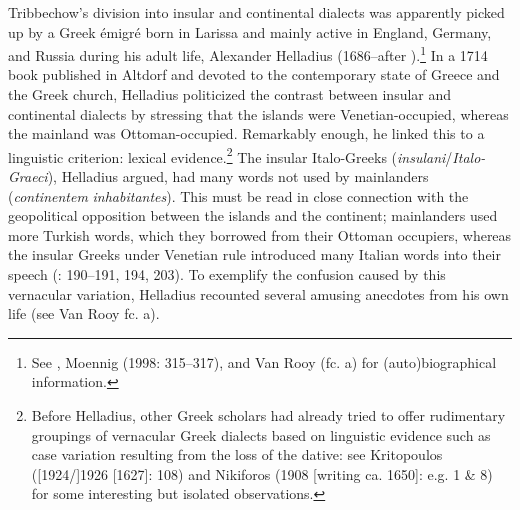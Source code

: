 Tribbechow’s division into insular and continental dialects was apparently picked up by a Greek émigré born in Larissa and mainly active in England, Germany, and Russia during his adult life, Alexander Helladius (1686–after \citealt{September1715}).\footnote{See \citet{Helladius1714}, Moennig (1998: 315–317), and Van Rooy (fc. a) for (auto)biographical information.} In a 1714 book published in Altdorf and devoted to the contemporary state of Greece and the Greek church, Helladius politicized the contrast between insular and continental dialects by stressing that the islands were Venetian-occupied, whereas the mainland was Ottoman-occupied. Remarkably enough, he linked this to a linguistic criterion: lexical evidence.\footnote{Before Helladius, other Greek scholars had already tried to offer rudimentary groupings of vernacular Greek dialects based on linguistic evidence such as case variation resulting from the loss of the dative: see Kritopoulos ([1924/]1926 [1627]: 108) and Nikiforos (1908 [writing ca. 1650]: e.g. 1 \& 8) for some interesting but isolated observations.} The insular Italo-Greeks (\textit{insulani}/\textit{Italo-Graeci}), Helladius argued, had many words not used by mainlanders (\textit{continentem} \textit{inhabitantes}). This must be read in close connection with the geopolitical opposition between the islands and the continent; mainlanders used more Turkish words, which they borrowed from their Ottoman occupiers, whereas the insular Greeks under Venetian rule introduced many Italian words into their speech (\citealt{Helladius1714}: 190–191, 194, 203). To exemplify the confusion caused by this vernacular variation, Helladius recounted several amusing anecdotes from his own life (see Van Rooy fc. a).

